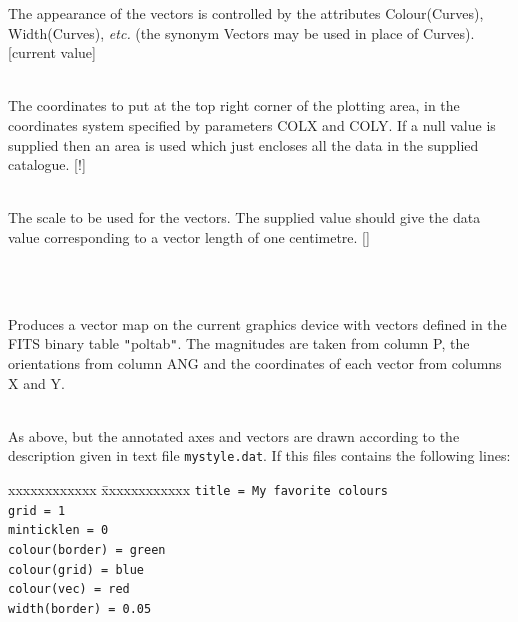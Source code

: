 \documentclass[twoside,11pt]{article}
\renewcommand{\_}{\texttt{\symbol{95}}}
\newlength{\sstexampleslength}
\newcommand{\sstexamples}[1]{
   \item[Examples:] \mbox{} \\
   \vspace{-3.5ex}
   \begin{description}
      #1
   \end{description}
}
\newcommand{\sstsubsection}[1]{ \item[{#1}] \mbox{} \\}
\newcommand{\sstexamplesubsection}[2]{\sloppy
\item[\parbox{\sstexampleslength}{\ssttt #1}] \mbox{} \vspace{1.0ex}
\\ #2 }
\newcommand{\sstexamples}[1]{
      \item[Examples:] \\
      \begin{description}
         #1
      \end{description}
      \\
   }
\newcommand{\sstsubsection}[1]{\item[{#1}]}
\newcommand{\sstexamplesubsection}[2]{\item[{\ssttt #1}] #2}
\begin{document}
{{{         The appearance of the vectors is controlled by the attributes
         Colour(Curves), Width(Curves), \emph{etc.} (the synonym Vectors may be
         used in place of Curves). [current value]
      }
      \sstsubsection{
         UBND(2) = \_REAL (Read)
      }{
         The coordinates to put at the top right corner of the plotting
         area, in the coordinates system specified by parameters COLX and
         COLY. If a null value is supplied then an area is used which just
         encloses all the data in the supplied catalogue. [!]
      }
      \sstsubsection{
         VSCALE = \_REAL (Read)
      }{
         The scale to be used for the vectors.  The supplied value
         should give the data value corresponding to a vector length of
         one centimetre.  []
      }
   }
   \sstexamples{
      \sstexamplesubsection{
         polplot poltab
      }{
         Produces a vector map on the current graphics device with
         vectors defined in the FITS binary table {\tt "}poltab{\tt "}. The magnitudes
         are taken from column P, the orientations from column ANG and
         the coordinates of each vector from columns X and Y.
      }
      \sstexamplesubsection{
         polplot poltab style=$\wedge$mystyle.dat
      }{
         As above, but the annotated axes and vectors are drawn according
         to the description given in text file \texttt{mystyle.dat}. If this
         files contains the following lines:

\begin{tabbing}
 xxxxxxxxxxxx \= xxxxxxxxxxxx \kill
              \>  \texttt{title = My favorite colours} \\
              \>  \texttt{grid = 1} \\
              \>  \texttt{minticklen = 0} \\
              \>  \texttt{colour(border) = green} \\
              \>  \texttt{colour(grid) = blue} \\
              \>  \texttt{colour(vec) = red} \\
              \>  \texttt{width(border) = 0.05}
\end{tabbing}

}}}
\end{document}
